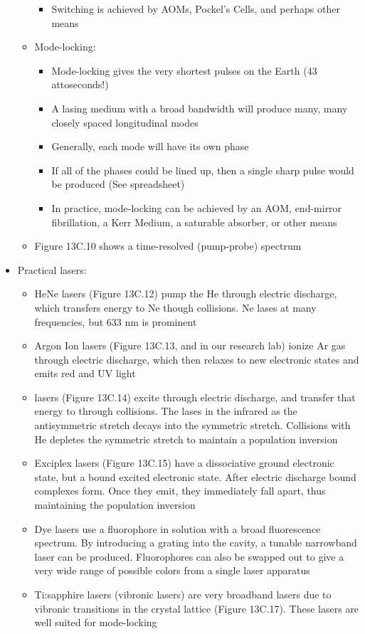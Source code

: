 \documentclass[12pt, openany, letterpaper]{memoir}
\begin{document}
\begin{itemize}
\begin{itemize}
\begin{itemize}
			\item Switching is achieved by AOMs, Pockel's Cells, and perhaps other means
		\end{itemize}
		\item Mode-locking:
		\begin{itemize}
			\item Mode-locking gives the very shortest pulses on the Earth (43 attoseconds!)
			\item A lasing medium with a broad bandwidth will produce many, many closely spaced longitudinal modes
			\item Generally, each mode will have its own phase
			\item If all of the phases could be lined up, then a single sharp pulse would be produced (See spreadsheet)
			\item In practice, mode-locking can be achieved by an AOM, end-mirror fibrillation, a Kerr Medium, a saturable absorber, or other means
		\end{itemize}
		\item Figure 13C.10 shows a time-resolved (pump-probe) spectrum
	\end{itemize}
	\item Practical lasers:
	\begin{itemize}
		\item HeNe lasers (Figure 13C.12) pump the He through electric discharge, which transfers energy to Ne though collisions. Ne lases at many frequencies, but  633 nm is prominent
		\item Argon Ion lasers (Figure 13C.13, and in our research lab) ionize Ar gas through electric discharge, which then relaxes to new electronic states and emits red and UV light
		\item {} lasers (Figure 13C.14) excite  through electric discharge, and transfer that energy to  through collisions. The  lases in the infrared as the antisymmetric stretch decays into the symmetric stretch. Collisions with He depletes the symmetric stretch to maintain a population inversion
		\item Exciplex lasers (Figure 13C.15) have a dissociative ground electronic state, but a bound excited electronic state. After electric discharge bound complexes form. Once they emit, they immediately fall apart, thus maintaining the population inversion
		\item Dye lasers use a fluorophore in solution with a broad fluorescence spectrum. By introducing a grating into the cavity, a tunable narrowband laser can be produced. Fluorophores can also be swapped out to give a very wide range of possible colors from a single laser apparatus
		\item Ti:sapphire lasers (vibronic lasers) are very broadband lasers due to vibronic transitions in the crystal lattice (Figure 13C.17). These lasers are well suited for mode-locking
	\end{itemize}
\end{itemize}
\end{document}
